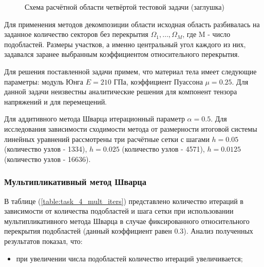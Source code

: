 \documentclass[a4paper]{article}
\begin{document}
\begin{figure}[h]
\caption{Схема расчётной области четвёртой тестовой задачи (заглушка)}
\label{fig:task_04_scheme}
\end{figure}

Для применения методов декомпозиции области исходная область разбивалась на заданное количество секторов без перекрытия $\Omega_1, \ldots, \Omega_M$, где M - число подобластей. Размеры участков, а именно центральный угол каждого из них, задавался заранее выбранным коэффициентом относительного перекрытия.

Для решения поставленной задачи примем, что материал тела имеет следующие параметры: модуль Юнга $E = 210$ ГПа, коэффициент Пуассона $\mu = 0.25$. Для данной задачи неизвестны аналитические решения для компонент тензора напряжений и для перемещений.

Для аддитивного метода Шварца итерационный параметр $\alpha = 0.5$. Для исследования зависимости сходимости метода от размерности итоговой системы линейных уравнений рассмотрены три расчётные сетки с шагами $h = 0.05$ (количество узлов - 1334), $h = 0.025$ (количество узлов - 4571), $h = 0.0125$ (количество узлов - 16636).


\subsubsection{Мультипликативный метод Шварца}

В таблице (\ref{table:task_4_mult_iters}) представлено количество итераций в зависимости от количества подобластей и шага сетки при использовании мультипликативного метода Шварца в случае фиксированного относительного перекрытия подобластей (данный коэффициент равен 0.3). Анализ полученных результатов показал, что:
\begin{itemize}
\item при увеличении числа подобластей количество итераций увеличивается;
\end{itemize}
\end{document}
